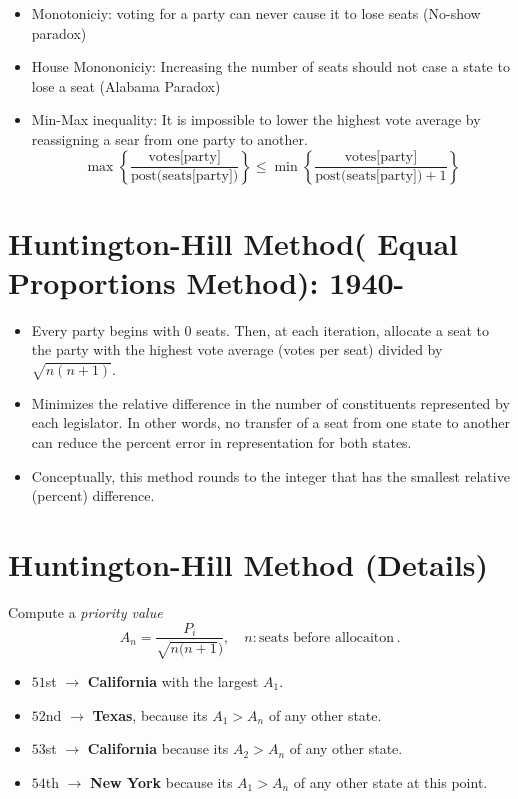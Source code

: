 \documentclass[
  letterpaper,
  DIV=11,
  numbers=noendperiod]{scrreprt}
\providecommand{\tightlist}{%
  \setlength{\itemsep}{0pt}\setlength{\parskip}{0pt}}\usepackage{longtable,booktabs,array}
\begin{document}
\begin{itemize}
\tightlist
\item
  Monotoniciy: voting for a party can never cause it to lose seats
  (No-show paradox)
\item
  House Monononiciy: Increasing the number of seats should not case a
  state to lose a seat (Alabama Paradox)
\item
  Min-Max inequality: It is impossible to lower the highest vote average
  by reassigning a sear from one party to another. \[
  \max \left\{\frac{\text{votes[party]}}{\text{post(seats[party])}}\right\} \le \min \left\{\frac{\text{votes[party]}}{\text{post(seats[party])}+1}\right\}
  \]
\end{itemize}

\section{Huntington-Hill Method( Equal Proportions Method):
1940-}\label{huntington-hill-method-equal-proportions-method-1940-}

\begin{itemize}
\item
  Every party begins with 0 seats. Then, at each iteration, allocate a
  seat to the party with the highest vote average (votes per seat)
  divided by \(\sqrt{n(n+1)}\).
\item
  Minimizes the relative difference in the number of constituents
  represented by each legislator. In other words, no transfer of a seat
  from one state to another can reduce the percent error in
  representation for both states.
\item
  Conceptually, this method rounds to the integer that has the smallest
  relative (percent) difference.
\end{itemize}

\section{Huntington-Hill Method
(Details)}\label{huntington-hill-method-details}

Compute a \emph{priority value} \[
A_n=\frac{P_i}{\sqrt{n(n+1})},\quad n: \text{seats before allocaiton}\,.
\]

\begin{itemize}
\tightlist
\item
  \(51\)st \(\rightarrow\) \textbf{California} with the largest
  \(A_1\).\\
\item
  \(52\)nd \(\rightarrow\) \textbf{Texas}, because its \(A_1>A_n\) of
  any other state.
\item
  \(53\)st \(\rightarrow\) \textbf{California} because its \(A_2>A_n\)
  of any other state.
\item
  \(54\)th \(\rightarrow\) \textbf{New York} because its \(A_1>A_n\) of
  any other state at this point.
\end{itemize}
\end{document}
